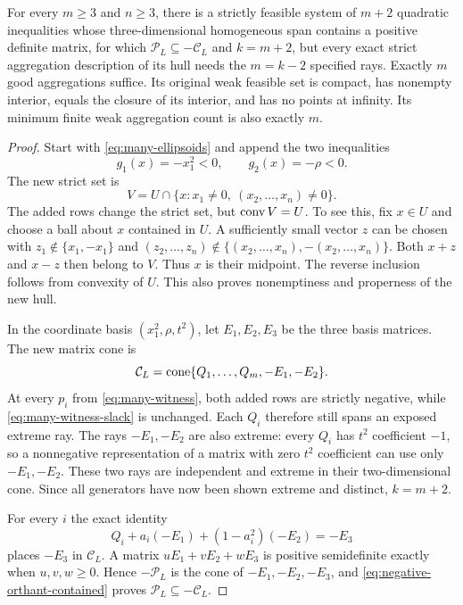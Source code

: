\begin{proposition}
\label{prop:complementary-many}
For every $m\geq3$ and $n\geq3$, there is a strictly feasible
system of $m+2$ quadratic inequalities whose three-dimensional
homogeneous span contains a
positive definite matrix, for which $\mathcal P_L\subseteq-\mathcal C_L$
and $k=m+2$, but every exact strict aggregation description of its hull
needs the $m=k-2$ specified rays. Exactly $m$ good aggregations suffice.
Its original weak feasible set is compact, has nonempty interior, equals
the closure of its interior, and has no points at infinity. Its minimum
finite weak aggregation count is also exactly $m$.
\end{proposition}
\begin{proof}
Start with \eqref{eq:many-ellipsoids} and append the two inequalities
\[
 g_1(x)=-x_1^2<0,\qquad g_2(x)=-\rho<0.
\]
The new strict set is
\[
 V=U\cap\{x:x_1\ne0,\ (x_2,\ldots,x_n)\ne0\}.
\]
The added rows change the strict set, but $\operatorname{conv} V=U$.
To see this, fix $x\in U$ and choose a ball about $x$ contained in
$U$. A sufficiently small vector $z$ can be chosen with
$z_1\notin\{x_1,-x_1\}$ and
$(z_2,\ldots,z_n)\notin\{(x_2,\ldots,x_n),-(x_2,\ldots,x_n)\}$.
Both $x+z$ and $x-z$ then belong to $V$. Thus $x$ is their midpoint.
The reverse inclusion follows from convexity of $U$. This also proves
nonemptiness and properness of the new hull.

In the coordinate basis $(x_1^2,\rho,t^2)$, let $E_1,E_2,E_3$
be the three basis matrices. The new matrix cone is
\[
 \mathcal C_L=\operatorname{cone}\{Q_1,\ldots,Q_m,-E_1,-E_2\}.
\]
At every $p_i$ from \eqref{eq:many-witness}, both added rows are
strictly negative, while \eqref{eq:many-witness-slack} is unchanged.
Each $Q_i$ therefore still spans an exposed extreme ray. The rays
$-E_1,-E_2$ are also extreme: every $Q_i$ has $t^2$ coefficient $-1$,
so a nonnegative representation of a matrix with zero $t^2$ coefficient
can use only $-E_1,-E_2$. These two rays are independent and extreme
in their two-dimensional cone. Since all generators have now been shown
extreme and distinct, $k=m+2$.

For every $i$ the exact identity
\begin{equation}\label{eq:negative-orthant-contained}
 Q_i+a_i(-E_1)+(1-a_i^2)(-E_2)=-E_3
\end{equation}
places $-E_3$ in $\mathcal C_L$. A matrix
$uE_1+vE_2+wE_3$ is positive semidefinite exactly when
$u,v,w\geq0$. Hence $-\mathcal P_L$ is the cone of
$-E_1,-E_2,-E_3$, and \eqref{eq:negative-orthant-contained} proves
$\mathcal P_L\subseteq-\mathcal C_L$.


\end{proof}

